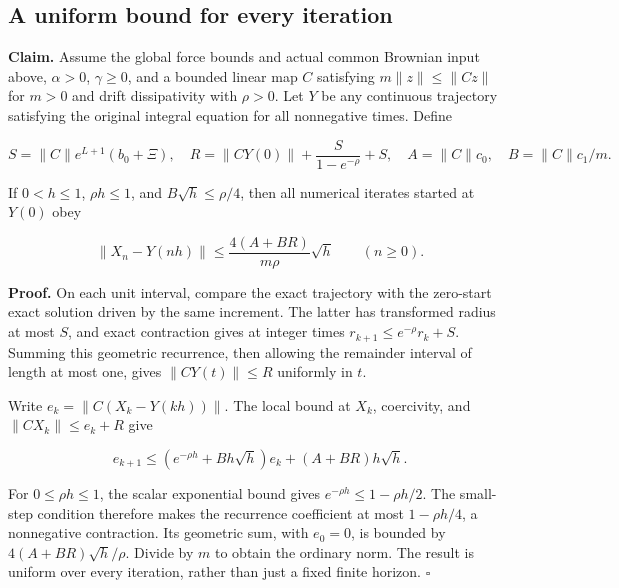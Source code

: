 \documentclass[11pt,a4paper]{report}
\begin{document}
\subsection{\texorpdfstring{A uniform bound for every iteration}{A uniform bound for every iteration}}


\textbf{Claim.} Assume the global force bounds and actual common Brownian input above, \(\alpha>0\), \(\gamma\ge0\), and a bounded linear map \(C\) satisfying \(m\|z\|\le\|Cz\|\) for \(m>0\) and drift dissipativity with \(\rho>0\). Let \(Y\) be any continuous trajectory satisfying the original integral equation for all nonnegative times. Define

\[S=\|C\|e^{L+1}(b_0+\Xi),\quad R=\|CY(0)\|+\frac S{1-e^{-\rho}}+S,\quad A=\|C\|c_0,\quad B=\|C\|c_1/m.\]

If \(0<h\le1\), \(\rho h\le1\), and \(B\sqrt h\le\rho/4\), then all numerical iterates started at \(Y(0)\) obey

\[\|X_n-Y(nh)\|\le\frac{4(A+BR)}{m\rho}\sqrt h\qquad(n\ge0).\]

\textbf{Proof.} On each unit interval, compare the exact trajectory with the zero-start exact solution driven by the same increment. The latter has transformed radius at most \(S\), and exact contraction gives at integer times \(r_{k+1}\le e^{-\rho}r_k+S\). Summing this geometric recurrence, then allowing the remainder interval of length at most one, gives \(\|CY(t)\|\le R\) uniformly in \(t\).



Write \(e_k=\|C(X_k-Y(kh))\|\). The local bound at \(X_k\), coercivity, and \(\|CX_k\|\le e_k+R\) give

\[e_{k+1}\le(e^{-\rho h}+Bh\sqrt h)e_k+(A+BR)h\sqrt h.\]

For \(0\le\rho h\le1\), the scalar exponential bound gives \(e^{-\rho h}\le1-\rho h/2\). The small-step condition therefore makes the recurrence coefficient at most \(1-\rho h/4\), a nonnegative contraction. Its geometric sum, with \(e_0=0\), is bounded by \(4(A+BR)\sqrt h/\rho\). Divide by \(m\) to obtain the ordinary norm. The result is uniform over every iteration, rather than just a fixed finite horizon. \(\square\)
\end{document}
